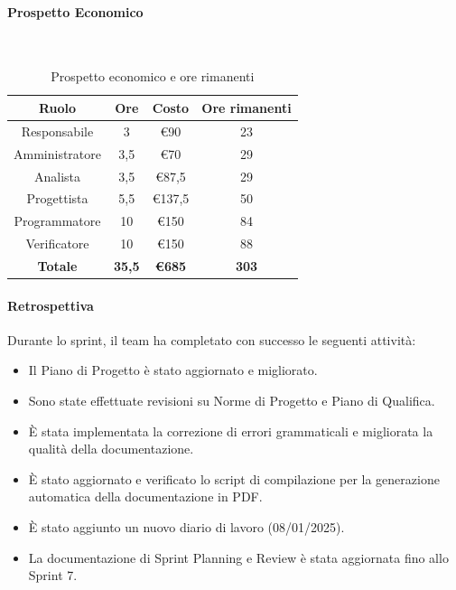 \documentclass{article}
\begin{document}
                \paragraph{Prospetto Economico}\mbox{}\\
                \begin{table}[H]
                    \centering
                    \begin{tabular}{|c|c|c|c|}
                    \hline
                    \textbf{Ruolo}  & \textbf{Ore}  & \textbf{Costo} & \textbf{Ore rimanenti} \\ \hline
                    Responsabile    & 3             & €90            & 23                     \\ \hline
                    Amministratore  & 3,5           & €70            & 29                   \\ \hline
                    Analista        & 3,5           & €87,5          & 29                   \\ \hline
                    Progettista     & 5,5           & €137,5         & 50                   \\ \hline
                    Programmatore   & 10            & €150           & 84                    \\ \hline
                    Verificatore    & 10            & €150           & 88                    \\ \hline
                    \textbf{Totale} & \textbf{35,5} & \textbf{\euro685}   & \textbf{303}         \\ \hline
                    \end{tabular}
                    \caption{Prospetto economico e ore rimanenti}
                \end{table}

                \paragraph{Retrospettiva}
                Durante lo sprint, il team ha completato con successo le seguenti attività:
                \begin{itemize}
                    \item Il Piano di Progetto è stato aggiornato e migliorato.
                    \item Sono state effettuate revisioni su Norme di Progetto e Piano di Qualifica.
                    \item È stata implementata la correzione di errori grammaticali e migliorata la qualità della documentazione.
                    \item È stato aggiornato e verificato lo script di compilazione per la generazione automatica della documentazione in PDF.
                    \item È stato aggiunto un nuovo diario di lavoro (08/01/2025).
                    \item La documentazione di Sprint Planning e Review è stata aggiornata fino allo Sprint 7.
                \end{itemize}
                
\end{document}
